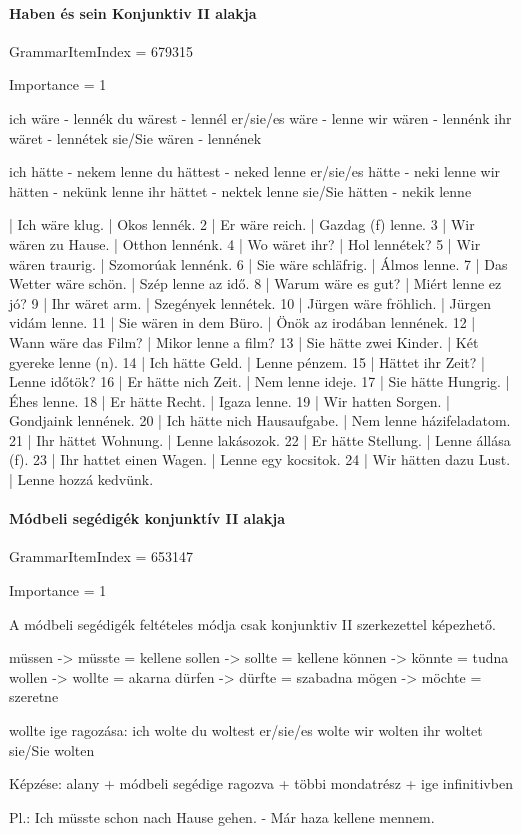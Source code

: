 \documentclass{article}
\newenvironment{desc}{\verbatim}{\endverbatim}
\newenvironment{exmp}{\verbatim}{\endverbatim}
\begin{document}
\paragraph{Haben és sein Konjunktiv II alakja}

GrammarItemIndex = 679315

Importance = 1

\begin{desc}
ich wäre - lennék
du wärest - lennél
er/sie/es wäre - lenne
wir wären - lennénk
ihr wäret - lennétek
sie/Sie wären - lennének

ich hätte - nekem lenne
du hättest - neked lenne
er/sie/es hätte - neki lenne
wir hätten - nekünk lenne
ihr hättet - nektek lenne
sie/Sie hätten - nekik lenne
\end{desc}

\begin{exmp}
1 | Ich wäre klug. | Okos lennék.
2 | Er wäre reich. | Gazdag (f) lenne.
3 | Wir wären zu Hause. | Otthon lennénk.
4 | Wo wäret ihr? | Hol lennétek?
5 | Wir wären traurig. | Szomorúak lennénk.
6 | Sie wäre schläfrig. | Álmos lenne.
7 | Das Wetter wäre schön. | Szép lenne az idő.
8 | Warum wäre es gut? | Miért lenne ez jó?
9 | Ihr wäret arm. | Szegények lennétek.
10 | Jürgen wäre fröhlich. | Jürgen vidám lenne.
11 | Sie wären in dem Büro. | Önök az irodában lennének.
12 | Wann wäre das Film? | Mikor lenne a film?
13 | Sie hätte zwei Kinder. | Két gyereke lenne (n).
14 | Ich hätte Geld. | Lenne pénzem.
15 | Hättet ihr Zeit? | Lenne időtök?
16 | Er hätte nich Zeit. | Nem lenne ideje.
17 | Sie hätte Hungrig. | Éhes lenne.
18 | Er hätte Recht. | Igaza lenne.
19 | Wir hatten Sorgen. | Gondjaink lennének.
20 | Ich hätte nich Hausaufgabe. | Nem lenne házifeladatom.
21 | Ihr hättet Wohnung. | Lenne lakásozok.
22 | Er hätte Stellung. | Lenne állása (f).
23 | Ihr hattet einen Wagen. | Lenne egy kocsitok.
24 | Wir hätten dazu Lust. | Lenne hozzá kedvünk.
\end{exmp}

\paragraph{Módbeli segédigék konjunktív II alakja}

GrammarItemIndex = 653147

Importance = 1

\begin{desc}
A módbeli segédigék feltételes módja csak konjunktiv II szerkezettel képezhető.

müssen -> müsste = kellene
sollen -> sollte = kellene
können -> könnte = tudna
wollen -> wollte = akarna
dürfen -> dürfte = szabadna
mögen -> möchte = szeretne

wollte ige ragozása:
ich wolte
du woltest
er/sie/es wolte
wir wolten
ihr woltet
sie/Sie wolten

Képzése: alany + módbeli segédige ragozva + többi mondatrész + ige infinitivben

Pl.: Ich müsste schon nach Hause gehen. - Már haza kellene mennem.
\end{desc}
\end{document}
